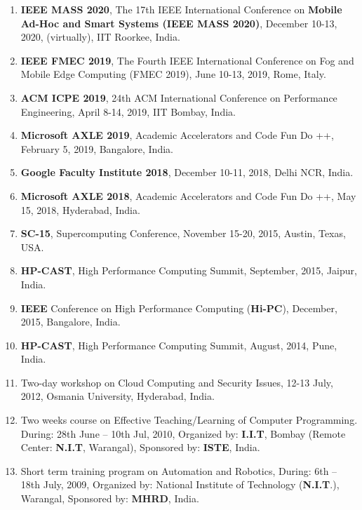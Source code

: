 \begin{enumerate}

\item
\textbf{IEEE MASS 2020}, The 17th IEEE International Conference on \textbf{Mobile Ad-Hoc and Smart Systems (IEEE MASS 2020)}, December 10-13, 2020, (virtually), IIT Roorkee, India. 
	
\item
\textbf{IEEE FMEC 2019}, The Fourth IEEE International Conference on Fog and Mobile Edge Computing (FMEC 2019), June 10-13, 2019, Rome, Italy.

\item
\textbf{ACM ICPE 2019}, 24th ACM International Conference on Performance Engineering, April 8-14, 2019, IIT Bombay, India.

\item
\textbf{Microsoft AXLE 2019}, Academic Accelerators and Code Fun Do ++, February 5, 2019, Bangalore, India.

\item
\textbf{Google Faculty Institute 2018}, December 10-11, 2018, Delhi NCR, India.

\item
\textbf{Microsoft AXLE 2018}, Academic Accelerators and Code Fun Do ++, May 15, 2018, Hyderabad, India.

\item
\textbf{SC-15}, Supercomputing Conference, November 15-20, 2015, Austin, Texas, USA.

\item
\textbf{HP-CAST}, High Performance Computing Summit, September, 2015, Jaipur, India.

\item
\textbf{IEEE} Conference on High Performance Computing (\textbf{Hi-PC}), December, 2015, Bangalore, India.

\item
\textbf{HP-CAST}, High Performance Computing Summit, August, 2014, Pune, India.

\item
Two-day workshop on Cloud Computing and Security Issues, 12-13 July, 2012, Osmania University, Hyderabad, India.

\item
Two weeks course on Effective Teaching/Learning of Computer Programming. During: 28th June – 10th Jul, 2010, Organized by:\textbf{ I.I.T}, Bombay (Remote Center:\textbf{ N.I.T}, Warangal), Sponsored by: \textbf{ISTE}, India.

\item
Short term training program on Automation and Robotics, During: 6th – 18th July, 2009, Organized by: National Institute of Technology (\textbf{N.I.T}.), Warangal, Sponsored by: \textbf{MHRD}, India. 


\end{enumerate}
